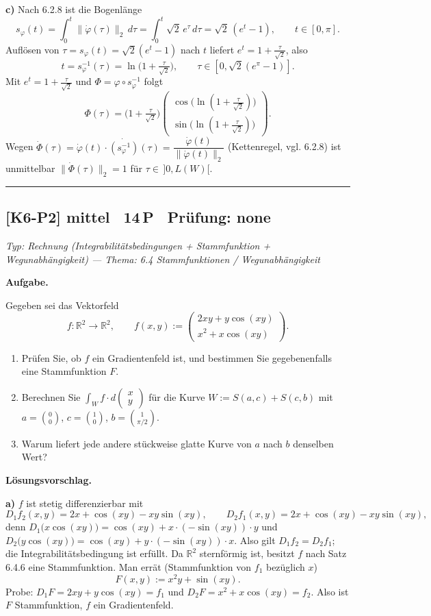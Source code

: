 \documentclass[a4paper,11pt]{article}
\begin{document}
\textbf{c)} Nach 6.2.8 ist die Bogenlänge
\[s_\varphi(t)=\int_0^{t}\lVert\dot\varphi(\tau)\rVert_2\,d\tau=\int_0^{t}\sqrt2\,e^{\tau}\,d\tau=\sqrt2\,(e^{t}-1),\qquad t\in[0,\pi].\]
Auflösen von $\tau=s_\varphi(t)=\sqrt2(e^t-1)$ nach $t$ liefert $e^{t}=1+\tfrac{\tau}{\sqrt2}$, also
\[t=s_\varphi^{-1}(\tau)=\ln\!\Big(1+\tfrac{\tau}{\sqrt2}\Big),\qquad \tau\in[0,\sqrt2(e^{\pi}-1)].\]
Mit $e^{t}=1+\tfrac{\tau}{\sqrt2}$ und $\Phi=\varphi\circ s_\varphi^{-1}$ folgt
\[\Phi(\tau)=\Big(1+\tfrac{\tau}{\sqrt2}\Big)\begin{pmatrix}\cos\!\big(\ln(1+\tfrac{\tau}{\sqrt2})\big)\\[2pt]\sin\!\big(\ln(1+\tfrac{\tau}{\sqrt2})\big)\end{pmatrix}.\]
Wegen $\dot\Phi(\tau)=\dot\varphi(t)\cdot\dot{(s_\varphi^{-1})}(\tau)=\dfrac{\dot\varphi(t)}{\lVert\dot\varphi(t)\rVert_2}$ (Kettenregel, vgl. 6.2.8) ist unmittelbar $\lVert\dot\Phi(\tau)\rVert_2=1$ für $\tau\in\,]0,L(W)[$.\par\bigskip\hrule\bigskip
\subsection*{[K6-P2] \normalfont mittel \textbullet\ 14\,P \textbullet\ Pr\"ufung: none}
\textit{Typ: Rechnung (Integrabilitätsbedingungen + Stammfunktion + Wegunabhängigkeit)  ---  Thema: 6.4 Stammfunktionen / Wegunabhängigkeit}\par\smallskip
\textbf{Aufgabe.}\par
Gegeben sei das Vektorfeld
\[f:\mathbb{R}^2\longrightarrow\mathbb{R}^2,\qquad f(x,y):=\begin{pmatrix} 2xy+y\cos(xy)\\ x^{2}+x\cos(xy)\end{pmatrix}.\]
\begin{enumerate}[label=\alph*)]
\item Prüfen Sie, ob $f$ ein Gradientenfeld ist, und bestimmen Sie gegebenenfalls eine Stammfunktion $F$.
\item Berechnen Sie $\displaystyle\int_W f\cdot d\!\begin{pmatrix}x\\y\end{pmatrix}$ für die Kurve $W:=S(a,c)+S(c,b)$ mit $a=\binom{0}{0}$, $c=\binom{1}{0}$, $b=\binom{1}{\pi/2}$.
\item Warum liefert jede andere stückweise glatte Kurve von $a$ nach $b$ denselben Wert?
\end{enumerate}\par\smallskip
\textbf{L\"osungsvorschlag.}\par
\textbf{a)} $f$ ist stetig differenzierbar mit
\[D_1 f_2(x,y)=2x+\cos(xy)-xy\sin(xy),\qquad D_2 f_1(x,y)=2x+\cos(xy)-xy\sin(xy),\]
denn $D_1\big(x\cos(xy)\big)=\cos(xy)+x\cdot(-\sin(xy))\cdot y$ und $D_2\big(y\cos(xy)\big)=\cos(xy)+y\cdot(-\sin(xy))\cdot x$. Also gilt $D_1 f_2=D_2 f_1$; die Integrabilitätsbedingung ist erfüllt. Da $\mathbb{R}^2$ sternförmig ist, besitzt $f$ nach Satz 6.4.6 eine Stammfunktion. Man errät (Stammfunktion von $f_1$ bezüglich $x$)
\[F(x,y):=x^{2}y+\sin(xy).\]
Probe: $D_1 F=2xy+y\cos(xy)=f_1$ und $D_2 F=x^{2}+x\cos(xy)=f_2$. Also ist $F$ Stammfunktion, $f$ ein Gradientenfeld.
\end{document}
